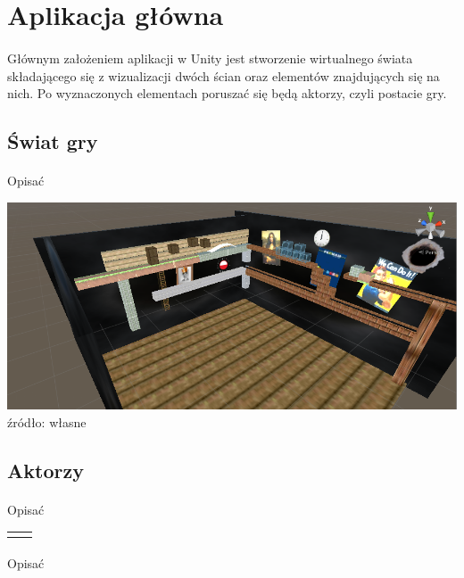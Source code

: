 \newpage
\section{Aplikacja główna}
\paragraph{}
Głównym założeniem aplikacji w Unity jest stworzenie wirtualnego świata składającego się z wizualizacji dwóch ścian oraz elementów znajdujących się na nich. Po wyznaczonych elementach poruszać się będą aktorzy, czyli postacie gry.

\subsection{Świat gry}
\paragraph{}
{\color{red}Opisać}

\begin{center}
\includegraphics[width=1\textwidth]{images/swiatgry.png}
\small {źródło: własne }
\end{center}


\subsection{Aktorzy}
\paragraph{}
{\color{red}Opisać}


\begin{center}

 \begin{tabular}{|c|c|}
 \hline  
  &   \\
  \hline   
  &   \\
  \hline   
\end{tabular}
\paragraph{}
{\color{red}Opisać}
\end{center}

